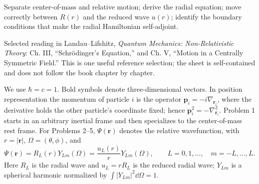 \documentclass[11pt]{article}
\begin{document}

\begin{goals}
Separate center-of-mass and relative motion; derive the radial equation; move
correctly between $R(r)$ and the reduced wave $u(r)$; identify the boundary
conditions that make the radial Hamiltonian self-adjoint.
\end{goals}

\begin{reading}
Selected reading in Landau--Lifshitz, \emph{Quantum Mechanics: Non-Relativistic
Theory}: Ch. III, ``Schr\"odinger's Equation,'' and Ch. V, ``Motion in a
Centrally Symmetric Field.'' This is one useful reference selection; the sheet
is self-contained and does not follow the book chapter by chapter.
\end{reading}


We use $\hbar=c=1$. Bold symbols denote three-dimensional vectors.
In position representation the momentum of particle $i$ is the operator
$\bm p_i=-i\nabla_{\bm r_i}$, where the derivative holds the other particle's
coordinate fixed; hence $\bm p_i^2=-\nabla_{\bm r_i}^2$.
Problem 1 starts in an arbitrary inertial frame and then specializes to the
center-of-mass rest frame. For Problems 2--5, $\Psi(\bm r)$ denotes the relative
wavefunction, with $r=|\bm r|$, $\Omega=(\theta,\phi)$, and
\[
\Psi(\bm r)=R_L(r)Y_{Lm}(\Omega)=\frac{u_L(r)}rY_{Lm}(\Omega),
\qquad L=0,1,\ldots,\quad m=-L,\ldots,L.
\]
Here $R_L$ is the radial wave and $u_L=rR_L$ is the reduced radial wave;
$Y_{Lm}$ is a spherical harmonic normalized by
$\int |Y_{Lm}|^2\dd\Omega=1$.
\end{document}
